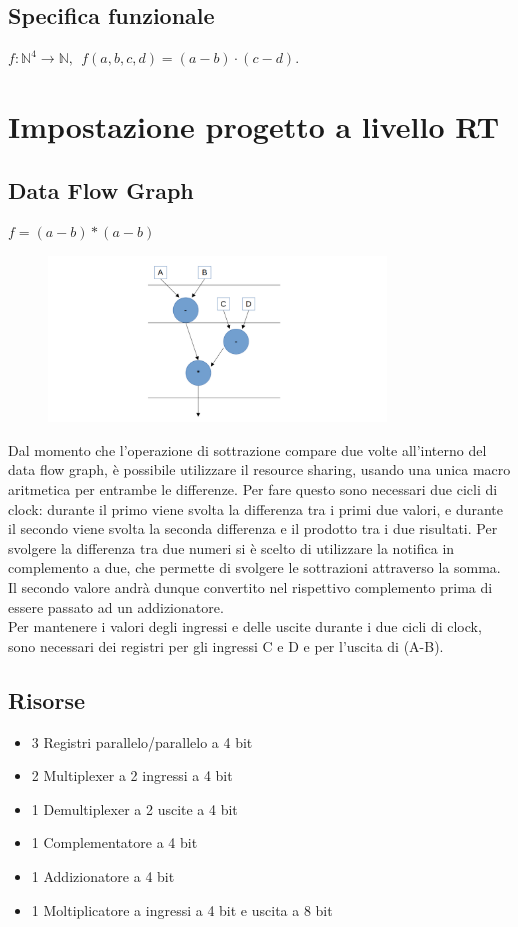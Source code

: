 \documentclass[10pt]{article}
\begin{document}
\subsection{Specifica funzionale}
$f:{\mathbb{N}^4} \longrightarrow \mathbb{N}, \ \ f(a,b,c,d) = (a-b)\cdot (c-d)$.
\newpage

\section{Impostazione progetto a livello RT}

\subsection{Data Flow Graph}
$f = (a-b) * (a-b)$
\begin{figure}[H]
    \centering
    \includegraphics[width=0.8\textwidth]{dfg}
\end{figure}

Dal momento che l'operazione di sottrazione compare due volte all'interno del data flow graph, è possibile utilizzare il resource sharing, usando una unica macro aritmetica per entrambe le differenze.
Per fare questo sono necessari due cicli di clock: durante il primo viene svolta la differenza tra i primi due valori, e durante il secondo viene svolta la seconda differenza e il prodotto tra i due
risultati. 
Per svolgere la differenza tra due numeri si è scelto di utilizzare la notifica in complemento a due, che permette di svolgere le sottrazioni attraverso la somma. 
Il secondo valore andrà dunque convertito nel rispettivo complemento prima di essere passato ad un addizionatore.
\\Per mantenere i valori degli ingressi e delle uscite durante i due cicli di clock, sono necessari dei registri per gli ingressi C e D e per l'uscita di (A-B).

\subsection{Risorse}
    \begin{itemize}
        \item 3 Registri parallelo/parallelo a 4 bit
        \item 2 Multiplexer a 2 ingressi a 4 bit
        \item 1 Demultiplexer a 2 uscite a 4 bit
        \item 1 Complementatore a 4 bit
        \item 1 Addizionatore a 4 bit
        \item 1 Moltiplicatore a ingressi a 4 bit e uscita a 8 bit
    \end{itemize}
\newpage
\end{document}
